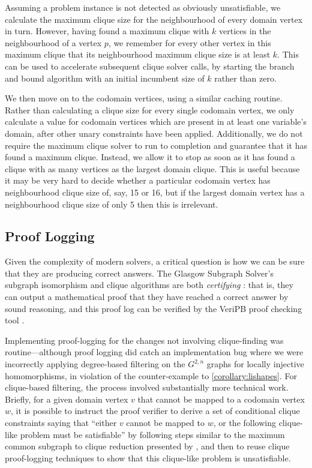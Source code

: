 \documentclass{article}
\newcommand{\citet}[1]{\citeauthor{#1} \shortcite{#1}}
\begin{document}
Assuming a problem instance is not detected as obviously unsatisfiable, we calculate the maximum
clique size for the neighbourhood of every domain vertex in turn. However, having found a maximum
clique with $k$ vertices in the neighbourhood of a vertex $p$, we remember for every other vertex in
this maximum clique that its neighbourhood maximum clique size is at least $k$. This can be used to
accelerate subsequent clique solver calls, by starting the branch and bound algorithm with an
initial incumbent size of $k$ rather than zero.

We then move on to the codomain vertices, using a similar caching routine. Rather than calculating a
clique size for every single codomain vertex, we only calculate a value for codomain vertices which are
present in at least one variable's domain, after other unary constraints have been applied.
Additionally, we do not require the maximum clique solver to run to completion and guarantee that it
has found a maximum clique. Instead, we allow it to stop as soon as it has found a clique with as
many vertices as the largest domain clique. This is useful because it may be very hard to decide
whether a particular codomain vertex has neighbourhood clique size of, say, 15 or 16, but if the
largest domain vertex has a neighbourhood clique size of only 5 then this is irrelevant.

\subsection{Proof Logging}

Given the complexity of modern solvers, a critical question is how we can be sure
that they are producing correct answers. The Glasgow Subgraph Solver's subgraph isomorphism and
clique algorithms are both \emph{certifying} \cite{DBLP:journals/csr/McConnellMNS11}: that is, they
can output a mathematical proof that they have reached a correct answer by sound reasoning, and this
proof log can be verified by the VeriPB proof checking tool
\cite{DBLP:conf/cp/GochtMMNPT20,DBLP:conf/ijcai/GochtMN20}.

Implementing proof-logging for the changes not involving clique-finding was routine---although proof
logging did catch an implementation bug where we were incorrectly applying degree-based filtering on
the $G^{2,n}$ graphs for locally injective homomorphisms, in violation of the counter-example to
\cref{corollary:lishapes}. For clique-based filtering, the process involved substantially more
technical work. Briefly, for a given domain vertex $v$ that cannot be mapped to a codomain vertex
$w$, it is possible to instruct the proof verifier to derive a set of conditional clique constraints
saying that ``either $v$ cannot be mapped to $w$, or the following clique-like problem must be
satisfiable'' by following steps similar to the maximum common subgraph to clique reduction
presented by \citet{DBLP:conf/cp/GochtMMNPT20}, and then to reuse clique
proof-logging techniques to show that this clique-like problem is unsatisfiable.
\end{document}
